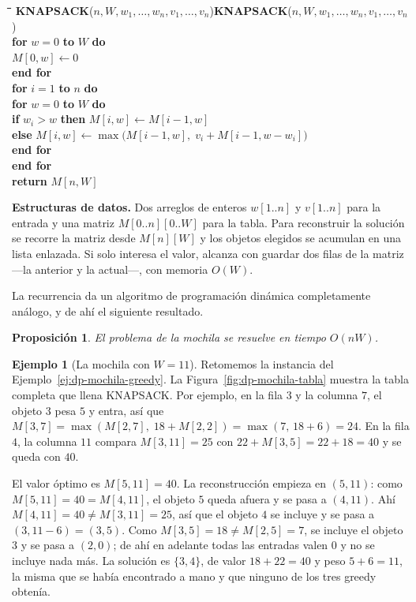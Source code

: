 \documentclass[12pt, spanish, oneside, openany]{book}
\newcommand{\pl}[1]{\makebox[1.6em][r]{\texttt{\footnotesize #1}}\hspace{0.9em}}
\newenvironment{pseudo}[1]{%
  \begin{center}%
  \begin{mdframed}[style=pseudobox]%
  \small
  \begin{tabbing}%
  \hspace{2.5em}\=\hspace{1.5em}\=\hspace{1.5em}\=\hspace{1.5em}\=\hspace{1.5em}\=\kill
  \def\pseudotitulo{#1}\ifx\pseudotitulo\empty\else#1\\[3pt]\fi}%
  {\end{tabbing}\end{mdframed}\end{center}}
\newenvironment{estructuras}%
  {\begin{center}\begin{minipage}{0.93\textwidth}\begin{mdframed}[style=estrbox]%
   \small\textbf{Estructuras de datos.}\;}%
  {\end{mdframed}\end{minipage}\end{center}}
\newcommand{\alg}[1]{#1}
\theoremstyle{uprightplain}
\newtheorem{proposicion}[teorema]{Proposición}
\theoremstyle{definition}
\newtheorem{ejemplo}[teorema]{Ejemplo}
\theoremstyle{remark}
\theoremstyle{definition}
\begin{document}
\begin{pseudo}{\textbf{KNAPSACK}($n, W, w_1,\dots,w_n, v_1,\dots,v_n$)}
\pl{1}\> \textbf{for} $w = 0$ \textbf{to} $W$ \textbf{do}\\
\pl{2}\>\> $M[0,w] \leftarrow 0$\\
\pl{3}\> \textbf{end for}\\
\pl{4}\> \textbf{for} $i = 1$ \textbf{to} $n$ \textbf{do}\\
\pl{5}\>\> \textbf{for} $w = 0$ \textbf{to} $W$ \textbf{do}\\
\pl{6}\>\>\> \textbf{if} $w_i > w$ \textbf{then} $M[i,w] \leftarrow M[i-1,w]$\\
\pl{7}\>\>\> \textbf{else} $M[i,w] \leftarrow \max\bigl(M[i-1,w],\; v_i+M[i-1,w-w_i]\bigr)$\\
\pl{8}\>\> \textbf{end for}\\
\pl{9}\> \textbf{end for}\\
\pl{10}\> \textbf{return} $M[n,W]$
\end{pseudo}

\begin{estructuras}
Dos arreglos de enteros $w[1..n]$ y $v[1..n]$ para la entrada y una matriz
$M[0..n][0..W]$ para la tabla. Para reconstruir la solución se recorre la
matriz desde $M[n][W]$ y los objetos elegidos se acumulan en una lista
enlazada. Si solo interesa el valor, alcanza con guardar dos filas de la
matriz ---la anterior y la actual---, con memoria $O(W)$.
\end{estructuras}

La recurrencia da un algoritmo de programación dinámica completamente análogo, y de ahí el siguiente resultado.

\begin{proposicion}
\label{prop:dp-mochila-tiempo}
El problema de la mochila se resuelve en tiempo $O(nW)$.
\end{proposicion}

\begin{ejemplo}[La mochila con $W=11$]
\label{ej:dp-mochila}
Retomemos la instancia del Ejemplo~\ref{ej:dp-mochila-greedy}. La Figura~\ref{fig:dp-mochila-tabla} muestra la tabla completa que llena \alg{KNAPSACK}. Por ejemplo, en la fila $3$ y la columna $7$, el objeto $3$ pesa $5$ y entra, así que $M[3,7]=\max(M[2,7],\;18+M[2,2])=\max(7,\,18+6)=24$. En la fila $4$, la columna $11$ compara $M[3,11]=25$ con $22+M[3,5]=22+18=40$ y se queda con $40$.

El valor óptimo es $M[5,11]=40$. La reconstrucción empieza en $(5,11)$: como $M[5,11]=40=M[4,11]$, el objeto $5$ queda afuera y se pasa a $(4,11)$. Ahí $M[4,11]=40\ne M[3,11]=25$, así que el objeto $4$ se incluye y se pasa a $(3,11-6)=(3,5)$. Como $M[3,5]=18\ne M[2,5]=7$, se incluye el objeto $3$ y se pasa a $(2,0)$; de ahí en adelante todas las entradas valen $0$ y no se incluye nada más. La solución es $\{3,4\}$, de valor $18+22=40$ y peso $5+6=11$, la misma que se había encontrado a mano y que ninguno de los tres greedy obtenía.
\end{ejemplo}
\end{document}
